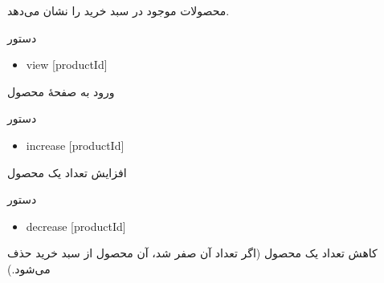 \documentclass[]{article}
\begin{document}
محصولات موجود در سبد خرید را نشان می‌دهد.


\begin{mybox}[colback=brilliantlavender]{دستور}

\begin{latin}

\begin{itemize}[label = {$\Rightarrow$}]

\item
view [productId]

\end{itemize}

\end{latin}

\end{mybox}

ورود به صفحهٔ محصول


\begin{mybox}[colback=brilliantlavender]{دستور}

\begin{latin}

\begin{itemize}[label = {$\Rightarrow$}]

\item
increase [productId]

\end{itemize}

\end{latin}

\end{mybox}

افزایش تعداد یک محصول



\begin{mybox}[colback=brilliantlavender]{دستور}

\begin{latin}

\begin{itemize}[label = {$\Rightarrow$}]

\item
decrease [productId]

\end{itemize}

\end{latin}

\end{mybox}

کاهش تعداد یک محصول (اگر تعداد آن صفر شد،‌ آن محصول از سبد خرید حذف می‌شود.)
\end{document}
